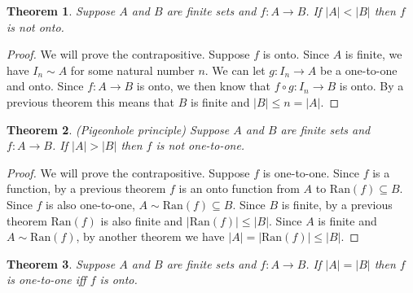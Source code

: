 \documentclass{report}
\newtheorem*{theorem}{Theorem}
\theoremstyle{definition}
\begin{document}
\begin{theorem}
Suppose $A$ and $B$ are finite sets and $f:A\to B$. If $|A|<|B|$ then $f$ is not onto.
\end{theorem}
\begin{proof}
We will prove the contrapositive. Suppose $f$ is onto. Since $A$ is finite, we have $I_n\sim A$ for some natural number $n$.
We can let $g:I_n\to A$ be a one-to-one and onto. Since $f:A\to B$ is onto, we then know that $f\circ g:I_n\to B$ is onto.
By a previous theorem this means that $B$ is finite and $|B|\leq n=|A|$. 
\end{proof}
\begin{theorem} (Pigeonhole principle)
Suppose $A$ and $B$ are finite sets and $f:A\to B$. If $|A|>|B|$ then $f$ is not one-to-one.
\end{theorem}
\begin{proof}
We will prove the contrapositive. Suppose $f$ is one-to-one. 
Since $f$ is a function, by a previous theorem $f$ is an onto function from $A$ to $\text{Ran}(f)\subseteq B$.
Since $f$ is also one-to-one, $A\sim\text{Ran}(f)\subseteq B$.
Since $B$ is finite, by a previous theorem $\text{Ran}(f)$ is also finite and $|\text{Ran}(f)|\leq|B|$. 
Since $A$ is finite and $A\sim\text{Ran}(f)$, by another theorem we have $|A|=|\text{Ran}(f)|\leq|B|$.
\end{proof}
\begin{theorem}
Suppose $A$ and $B$ are finite sets and $f:A\to B$. If $|A|=|B|$ then $f$ is one-to-one iff $f$ is onto.
\end{theorem}
\end{document}

